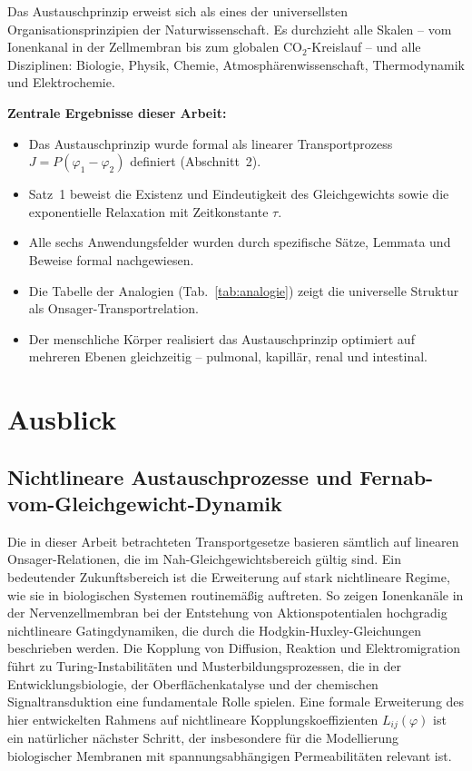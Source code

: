 ﻿\documentclass[a4paper,12pt]{article}
\theoremstyle{definition}
\begin{document}
Das Austauschprinzip erweist sich als eines der universellsten Organisationsprinzipien
der Naturwissenschaft. Es durchzieht alle Skalen -- vom Ionenkanal in der Zellmembran
bis zum globalen CO$_2$-Kreislauf -- und alle Disziplinen: Biologie, Physik, Chemie,
Atmosphärenwissenschaft, Thermodynamik und Elektrochemie.

\textbf{Zentrale Ergebnisse dieser Arbeit:}
\begin{itemize}
    \item Das Austauschprinzip wurde formal als linearer Transportprozess
          $J = P(\varphi_1 - \varphi_2)$ definiert (Abschnitt~2).
    \item Satz~1 beweist die Existenz und Eindeutigkeit des Gleichgewichts
          sowie die exponentielle Relaxation mit Zeitkonstante $\tau$.
    \item Alle sechs Anwendungsfelder wurden durch spezifische Sätze, Lemmata
          und Beweise formal nachgewiesen.
    \item Die Tabelle der Analogien (Tab.~\ref{tab:analogie}) zeigt die
          universelle Struktur als Onsager-Transportrelation.
    \item Der menschliche Körper realisiert das Austauschprinzip optimiert auf
          mehreren Ebenen gleichzeitig -- pulmonal, kapillär, renal und intestinal.
\end{itemize}

\section{Ausblick}

\subsection{Nichtlineare Austauschprozesse und Fernab-vom-Gleichgewicht-Dynamik}

Die in dieser Arbeit betrachteten Transportgesetze basieren sämtlich auf linearen
Onsager-Relationen, die im Nah-Gleichgewichtsbereich gültig sind. Ein bedeutender
Zukunftsbereich ist die Erweiterung auf stark nichtlineare Regime, wie sie in
biologischen Systemen routinemäßig auftreten. So zeigen Ionenkanäle in der
Nervenzellmembran bei der Entstehung von Aktionspotentialen hochgradig nichtlineare
Gatingdynamiken, die durch die Hodgkin-Huxley-Gleichungen beschrieben werden. Die
Kopplung von Diffusion, Reaktion und Elektromigration führt zu Turing-Instabilitäten
und Musterbildungsprozessen, die in der Entwicklungsbiologie, der Oberflächenkatalyse
und der chemischen Signaltransduktion eine fundamentale Rolle spielen. Eine formale
Erweiterung des hier entwickelten Rahmens auf nichtlineare Kopplungskoeffizienten
$L_{ij}(\varphi)$ ist ein natürlicher nächster Schritt, der insbesondere für die
Modellierung biologischer Membranen mit spannungsabhängigen Permeabilitäten relevant ist.
\end{document}
